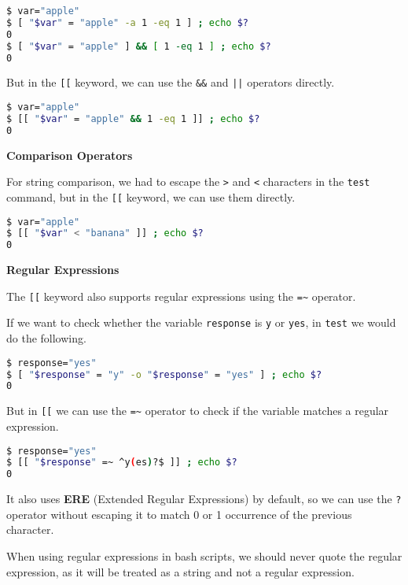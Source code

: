 \begin{lstlisting}[language=bash]
$ var="apple"
$ [ "$var" = "apple" -a 1 -eq 1 ] ; echo $?
0
$ [ "$var" = "apple" ] && [ 1 -eq 1 ] ; echo $?
0
\end{lstlisting}

But in the \lstinline{[[} keyword, we can use the \lstinline{&&} and \lstinline{||} operators directly.

\begin{lstlisting}[language=bash]
$ var="apple"
$ [[ "$var" = "apple" && 1 -eq 1 ]] ; echo $?
0
\end{lstlisting}

\textbf{Comparison Operators}

For string comparison, we had to escape the \lstinline{>} and \lstinline{<} characters in the \lstinline{test} command, but in the \lstinline{[[} keyword, we can use them directly.

\begin{lstlisting}[language=bash]
$ var="apple"
$ [[ "$var" < "banana" ]] ; echo $?
0
\end{lstlisting}

\textbf{Regular Expressions}

The \lstinline{[[} keyword also supports regular expressions using the \lstinline{=~} operator.

If we want to check whether the variable \lstinline|response| is \lstinline|y| or \lstinline|yes|, in \lstinline|test| we would do the following.

\begin{lstlisting}[language=bash]
$ response="yes"
$ [ "$response" = "y" -o "$response" = "yes" ] ; echo $?
0
\end{lstlisting}

But in \lstinline|[[| we can use the \lstinline{=~} operator to check if the variable matches a regular expression.

\begin{lstlisting}[language=bash]
$ response="yes"
$ [[ "$response" =~ ^y(es)?$ ]] ; echo $?
0
\end{lstlisting}

It also uses \textbf{ERE} (Extended Regular Expressions) by default, so we can use the \lstinline|?| operator without escaping it to match 0 or 1 occurrence of the previous character.

\begin{warn}
  When using regular expressions in bash scripts, we should never quote the regular expression, as it will be treated as a string and not a regular expression.
\end{warn}

